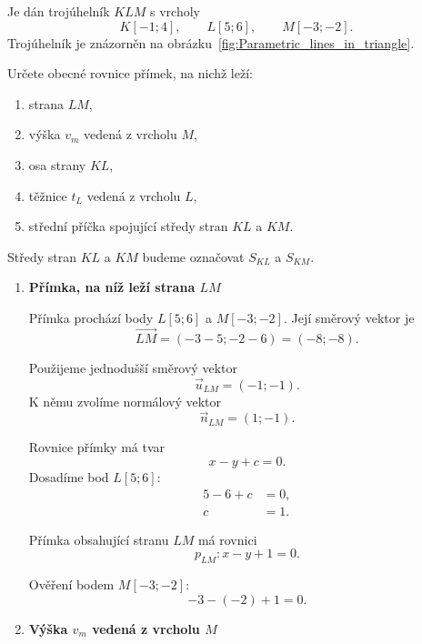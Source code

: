 \begin{example}\label{exa:General_lines_in_triangle}
    Je dán trojúhelník $KLM$ s vrcholy
    \[
        K[-1;4],
        \qquad
        L[5;6],
        \qquad
        M[-3;-2].
    \]
    Trojúhelník je znázorněn na obrázku~\ref{fig:Parametric_lines_in_triangle}.

    Určete obecné rovnice přímek, na nichž leží:
    \begin{enumerate}[label=\alph*)]
        \item strana $LM$,
        \item výška $v_m$ vedená z vrcholu $M$,
        \item osa strany $KL$,
        \item těžnice $t_L$ vedená z vrcholu $L$,
        \item střední příčka spojující středy stran $KL$ a $KM$.
    \end{enumerate}

    Středy stran $KL$ a $KM$ budeme označovat $S_{KL}$ a $S_{KM}$.

    \begin{enumerate}[label=\alph*), leftmargin=2em]

        \item \textbf{Přímka, na níž leží strana $LM$}

        Přímka prochází body $L[5;6]$ a $M[-3;-2]$. Její směrový
        vektor je
        \[
            \overrightarrow{LM}
            =
            (-3-5;-2-6)
            =
            (-8;-8).
        \]

        Použijeme jednodušší směrový vektor
        \[
            \vec{u}_{LM}=(-1;-1).
        \]
        K němu zvolíme normálový vektor
        \[
            \vec{n}_{LM}=(1;-1).
        \]

        Rovnice přímky má tvar
        \[
            x-y+c=0.
        \]
        Dosadíme bod $L[5;6]$:
        \begin{align*}
            5-6+c&=0,\\
            c&=1.
        \end{align*}

        Přímka obsahující stranu $LM$ má rovnici
        \[
            p_{LM}: x-y+1=0.
        \]

        Ověření bodem $M[-3;-2]$:
        \[
            -3-(-2)+1=0.
        \]

        \item \textbf{Výška $v_m$ vedená z vrcholu $M$}


\end{enumerate}
\end{example}
